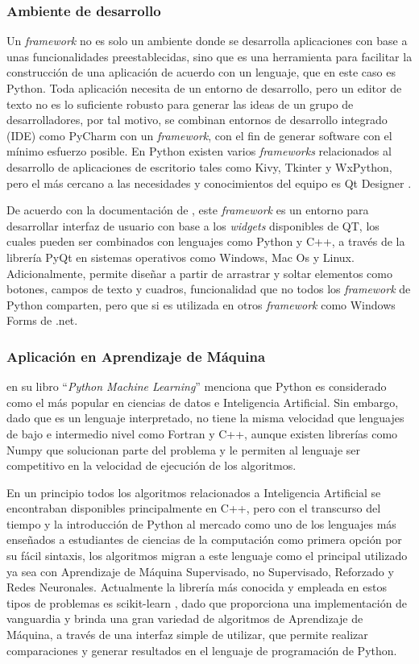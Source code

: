 \subsubsection{Ambiente de desarrollo}
Un \textit{framework} no es solo un ambiente donde se desarrolla aplicaciones con base a unas funcionalidades preestablecidas, sino que es una herramienta para facilitar la construcción de una aplicación de acuerdo con un lenguaje, que en este caso es Python. Toda aplicación necesita de un entorno de desarrollo, pero un editor de texto no es lo suficiente robusto para generar las ideas de un grupo de desarrolladores, por tal motivo, se combinan entornos de desarrollo integrado (IDE) como PyCharm con un \textit{framework}, con el fin de generar software con el mínimo esfuerzo posible. En Python existen varios \textit{frameworks} relacionados al desarrollo de aplicaciones de escritorio tales como Kivy, Tkinter y WxPython, pero el más cercano a las necesidades y conocimientos del equipo es Qt Designer \parencite{QTDes}. 

De acuerdo con la documentación de \textcite{QTDesDoc}, este \textit{framework} es un entorno para desarrollar interfaz de usuario con base a los \textit{widgets} disponibles de QT, los cuales pueden ser combinados con lenguajes como Python y C++, a través de la librería PyQt en sistemas operativos como Windows, Mac Os y Linux. Adicionalmente, permite diseñar a partir de arrastrar y soltar elementos como botones, campos de texto y cuadros, funcionalidad que no todos los \textit{framework} de Python comparten, pero que si es utilizada en otros \textit{framework} como Windows Forms de .net.

\subsubsection{Aplicación en Aprendizaje de Máquina}
\textcite{raschka2015python} en su libro ``\textit{Python Machine Learning}'' menciona que Python es considerado como el más popular en ciencias de datos e Inteligencia Artificial. Sin embargo, dado que es un lenguaje interpretado, no tiene la misma velocidad que lenguajes de bajo e intermedio nivel como Fortran y C++, aunque existen librerías como Numpy que solucionan parte del problema y le permiten al lenguaje ser competitivo en la velocidad de ejecución de los algoritmos.

En un principio todos los algoritmos relacionados a Inteligencia Artificial se encontraban disponibles principalmente en C++, pero con el transcurso del tiempo y la introducción de Python al mercado como uno de los lenguajes más enseñados a estudiantes de ciencias de la computación como primera opción por su fácil sintaxis, los algoritmos migran a este lenguaje como el principal utilizado ya sea con Aprendizaje de Máquina Supervisado, no Supervisado, Reforzado y Redes Neuronales. Actualmente la librería más conocida y empleada en estos tipos de problemas es scikit-learn \parencite{scikit-learn}, dado que proporciona una implementación de vanguardia y brinda una gran variedad de algoritmos de Aprendizaje de Máquina, a través de una interfaz simple de utilizar, que permite realizar comparaciones y generar resultados en el lenguaje de programación de Python.


